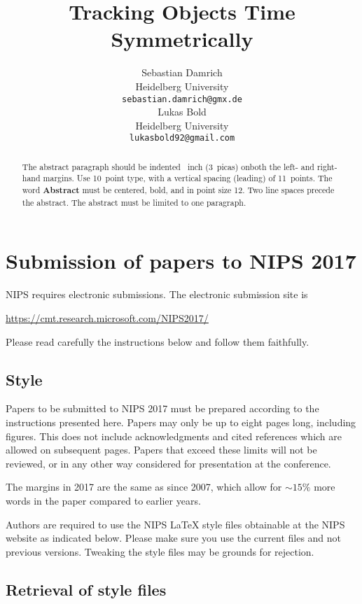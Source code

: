 \documentclass{article}
\title{Tracking Objects Time Symmetrically}
\author{
	Sebastian Damrich 
    \\
  Heidelberg University\\
  \texttt{sebastian.damrich@gmx.de} \\
   \And
   Lukas Bold  \\
   Heidelberg University \\
  \texttt{lukasbold92@gmail.com} \\
}
\begin{document}

\maketitle

\begin{abstract}
  The abstract paragraph should be indented ~inch
  (3~picas) onboth the left- and right-hand margins. Use 10~point
  type, with a vertical spacing (leading) of 11~points.  The word
  \textbf{Abstract} must be centered, bold, and in point size 12. Two
  line spaces precede the abstract. The abstract must be limited to
  one paragraph.
\end{abstract}

\section{Submission of papers to NIPS 2017}

NIPS requires electronic submissions.  The electronic submission site
is
\begin{center}
  \url{https://cmt.research.microsoft.com/NIPS2017/}
\end{center}

Please read carefully the instructions below and follow them
faithfully.

\subsection{Style}

Papers to be submitted to NIPS 2017 must be prepared according to the
instructions presented here. Papers may only be up to eight pages
long, including figures. This does not include acknowledgments and 
cited references which are allowed on subsequent pages.
Papers that exceed these limits will not be reviewed, or in any
other way considered for presentation at the conference.

The margins in 2017 are the same as since 2007, which allow for
$\sim$$15\%$ more words in the paper compared to earlier years.

Authors are required to use the NIPS \LaTeX{} style files obtainable
at the NIPS website as indicated below. Please make sure you use the
current files and not previous versions. Tweaking the style files may
be grounds for rejection.

\subsection{Retrieval of style files}
\end{document}

